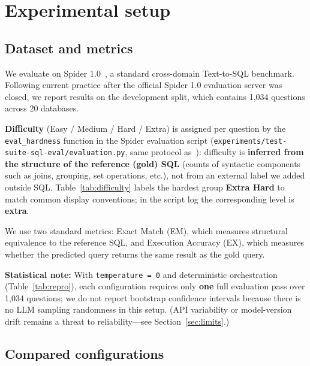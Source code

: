 \section{Experimental setup}\label{sec:exp}

\subsection{Dataset and metrics}\label{subsec:data}

We evaluate on Spider 1.0~\cite{yu2018spider}, a standard cross-domain Text-to-SQL benchmark. Following current practice after the official Spider 1.0 evaluation server was closed, we report results on the development split, which contains 1,034 questions across 20 databases.

\textbf{Difficulty} (Easy / Medium / Hard / Extra) is assigned per question by the \texttt{eval\_hardness} function in the Spider evaluation script (\texttt{experiments/test-suite-sql-eval/evaluation.py}, same protocol as~\cite{yu2018spider}): difficulty is \textbf{inferred from the structure of the reference (gold) SQL} (counts of syntactic components such as joins, grouping, set operations, etc.), not from an external label we added outside SQL. Table~\ref{tab:difficulty} labels the hardest group \textbf{Extra Hard} to match common display conventions; in the script log the corresponding level is \textbf{extra}.

We use two standard metrics: Exact Match (EM), which measures structural equivalence to the reference SQL, and Execution Accuracy (EX), which measures whether the predicted query returns the same result as the gold query.

\textbf{Statistical note:} With \texttt{temperature = 0} and deterministic orchestration (Table~\ref{tab:repro}), each configuration requires only \textbf{one} full evaluation pass over 1,034 questions; we do not report bootstrap confidence intervals because there is no LLM sampling randomness in this setup. (API variability or model-version drift remains a threat to reliability---see Section~\ref{sec:limits}.)

\subsection{Compared configurations}\label{subsec:configs}

